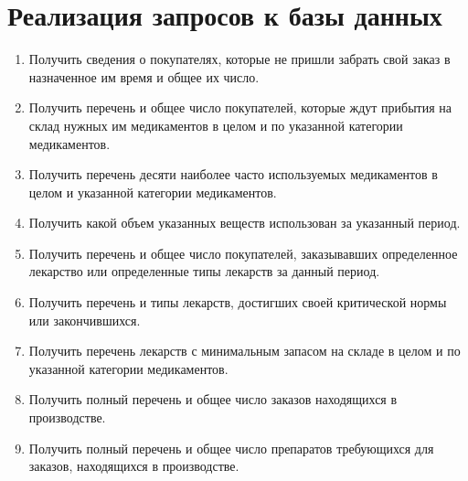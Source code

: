 \documentclass[a4paper]{article}
\begin{document}
	\section{Реализация запросов к базы данных}
		\begin{enumerate}			
			\item Получить сведения о покупателях, которые не пришли забрать свой заказ в назначенное им время и общее их число.
			
			
			
			\item Получить перечень и общее число покупателей, которые ждут прибытия на склад нужных им медикаментов в целом и по указанной категории медикаментов.
			
			\item Получить перечень десяти наиболее часто используемых медикаментов в целом и указанной категории медикаментов.
			
			\item  Получить какой объем указанных веществ использован за указанный период.
			
			\item Получить перечень и общее число покупателей, заказывавших определенное лекарство или определенные типы лекарств за данный период.
			
			
			
			
			
			\item Получить перечень и типы лекарств, достигших своей критической нормы или закончившихся.
			
			\item Получить перечень лекарств с минимальным запасом на складе в целом и по указанной категории медикаментов.
			
			\item Получить полный перечень и общее число заказов находящихся в производстве.
			
			
			
			\item Получить полный перечень и общее число препаратов требующихся для заказов, находящихся в производстве.
			

\end{enumerate}
\end{document}

